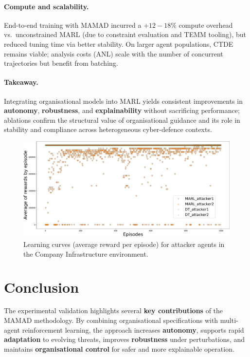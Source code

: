 \documentclass[a4paper,10pt,twocolumn]{article}
\begin{document}
\paragraph{Compute and scalability.}
End-to-end training with MAMAD incurred a $+12{-}18\%$ compute overhead vs.\ unconstrained MARL
(due to constraint evaluation and TEMM tooling), but reduced tuning time via better stability.
On larger agent populations, CTDE remains viable; analysis costs (ANL) scale with the number
of concurrent trajectories but benefit from batching.

\paragraph{Takeaway.}
Integrating organisational models into MARL yields consistent improvements in
\textbf{autonomy}, \textbf{robustness}, and \textbf{explainability} without sacrificing
performance; ablations confirm the structural value of organisational guidance and its role
in stability and compliance across heterogeneous cyber-defence contexts.

\begin{figure}[h!]
    \centering
    \includegraphics[width=\linewidth]{figures/results_infra_learning.pdf}
    \caption{Learning curves (average reward per episode) for attacker agents in the Company Infrastructure environment.}
    \label{fig:infra_learning_curves}
\end{figure}





\section{Conclusion}

The experimental validation highlights several \textbf{key contributions}
of the MAMAD methodology. By combining organisational specifications with
multi-agent reinforcement learning, the approach increases
\textbf{autonomy}, supports rapid \textbf{adaptation} to evolving threats,
improves \textbf{robustness} under perturbations, and maintains
\textbf{organisational control} for safer and more explainable operation.
\end{document}
